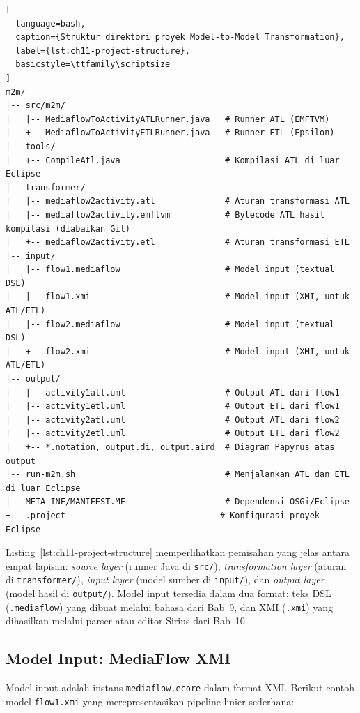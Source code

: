 \begin{lstlisting}[
  language=bash,
  caption={Struktur direktori proyek Model-to-Model Transformation},
  label={lst:ch11-project-structure},
  basicstyle=\ttfamily\scriptsize
]
m2m/
|-- src/m2m/
|   |-- MediaflowToActivityATLRunner.java   # Runner ATL (EMFTVM)
|   +-- MediaflowToActivityETLRunner.java   # Runner ETL (Epsilon)
|-- tools/
|   +-- CompileAtl.java                     # Kompilasi ATL di luar Eclipse
|-- transformer/
|   |-- mediaflow2activity.atl              # Aturan transformasi ATL
|   |-- mediaflow2activity.emftvm           # Bytecode ATL hasil kompilasi (diabaikan Git)
|   +-- mediaflow2activity.etl              # Aturan transformasi ETL
|-- input/
|   |-- flow1.mediaflow                     # Model input (textual DSL)
|   |-- flow1.xmi                           # Model input (XMI, untuk ATL/ETL)
|   |-- flow2.mediaflow                     # Model input (textual DSL)
|   +-- flow2.xmi                           # Model input (XMI, untuk ATL/ETL)
|-- output/
|   |-- activity1atl.uml                    # Output ATL dari flow1
|   |-- activity1etl.uml                    # Output ETL dari flow1
|   |-- activity2atl.uml                    # Output ATL dari flow2
|   |-- activity2etl.uml                    # Output ETL dari flow2
|   +-- *.notation, output.di, output.aird  # Diagram Papyrus atas output
|-- run-m2m.sh                              # Menjalankan ATL dan ETL di luar Eclipse
|-- META-INF/MANIFEST.MF                    # Dependensi OSGi/Eclipse
+-- .project                               # Konfigurasi proyek Eclipse
\end{lstlisting}

\noindent Listing~\ref{lst:ch11-project-structure} memperlihatkan pemisahan yang jelas antara empat lapisan: \textit{source layer} (runner Java di \texttt{src/}), \textit{transformation layer} (aturan di \texttt{transformer/}), \textit{input layer} (model sumber di \texttt{input/}), dan \textit{output layer} (model hasil di \texttt{output/}). Model input tersedia dalam dua format: teks DSL (\texttt{.mediaflow}) yang dibuat melalui bahasa dari Bab~9, dan XMI (\texttt{.xmi}) yang dihasilkan melalui parser atau editor Sirius dari Bab~10.

\subsection{Model Input: MediaFlow XMI}

Model input adalah instans \texttt{mediaflow.ecore} dalam format XMI. Berikut contoh model \texttt{flow1.xmi} yang merepresentasikan pipeline linier sederhana:

